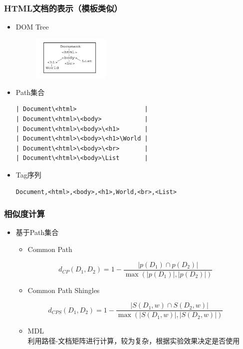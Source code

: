 \documentclass[11pt,presentation]{beamer}
\begin{document}
\begin{frame}[fragile]
\frametitle{HTML文档的表示（模板类似）}
\label{sec-2-6}
\begin{itemize}

\item DOM Tree\\
\label{sec-2-6-1}%
\begin{figure}[htb]
    \centering
    \includegraphics[width=10em,angle=0]{./Selection_001.png}
    \end{figure}

\item Path集合\\
\label{sec-2-6-2}%
\tiny

\begin{verbatim}
| Document\<html>                   |
| Document\<html>\<body>            |
| Document\<html>\<body>\<h1>       |
| Document\<html>\<body>\<h1>\World |
| Document\<html>\<body>\<br>       |
| Document\<html>\<body>\List       |
\end{verbatim}
\normalsize

\item Tag序列\\
\label{sec-2-6-3}%
\tiny

\begin{verbatim}
Document,<html>,<body>,<h1>,World,<br>,<List>
\end{verbatim}
\end{itemize} %
\end{frame}
\begin{frame}
\frametitle{相似度计算}
\label{sec-2-7}
\begin{itemize}

\item 基于Path集合
\label{sec-2-7-1}%
\begin{itemize}
\item Common Path
\end{itemize}
\[
d_{CP}(D_1,D_2)=1-\frac{|p(D_1)\cap p(D_2)|}{\max (|p(D_1)|, |p(D_2)|)}
\]
\begin{itemize}
\item Common Path Shingles
\end{itemize}
\[
d_{CPS}(D_1,D_2)=1-\frac{|S(D_1,w)\cap S(D_2,w)|}{\max (|S(D_1,w)|, |S(D_2,w)|)}
\]
\begin{itemize}
\item MDL\cite{6}\\
利用路径-文档矩阵进行计算，较为复杂，根据实验效果决定是否使用
\end{itemize}
\end{itemize} %
\end{frame}
\end{document}

